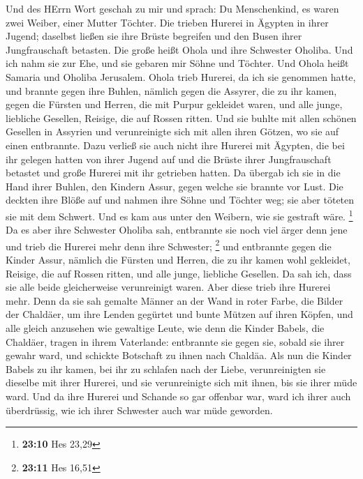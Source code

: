  Und des HErrn Wort geschah zu mir und sprach: 
Du Menschenkind, es waren zwei Weiber, einer Mutter Töchter.
 Die trieben Hurerei in Ägypten in ihrer Jugend; daselbst
ließen sie ihre Brüste begreifen und den Busen ihrer Jungfrauschaft
betasten.  Die große heißt Ohola und ihre Schwester Oholiba.
Und ich nahm sie zur Ehe, und sie gebaren mir Söhne und Töchter. Und
Ohola heißt Samaria und Oholiba Jerusalem.  Ohola trieb
Hurerei, da ich sie genommen hatte, und brannte gegen ihre Buhlen,
nämlich gegen die Assyrer, die zu ihr kamen,  gegen die
Fürsten und Herren, die mit Purpur gekleidet waren, und alle junge,
liebliche Gesellen, Reisige, die auf Rossen ritten.  Und sie
buhlte mit allen schönen Gesellen in Assyrien und verunreinigte sich mit
allen ihren Götzen, wo sie auf einen entbrannte.  Dazu
verließ sie auch nicht ihre Hurerei mit Ägypten, die bei ihr gelegen
hatten von ihrer Jugend auf und die Brüste ihrer Jungfrauschaft betastet
und große Hurerei mit ihr getrieben hatten.  Da übergab ich
sie in die Hand ihrer Buhlen, den Kindern Assur, gegen welche sie
brannte vor Lust.  Die deckten ihre Blöße auf und nahmen
ihre Söhne und Töchter weg; sie aber töteten sie mit dem Schwert. Und es
kam aus unter den Weibern, wie sie gestraft wäre. \footnote{\textbf{23:10}
  Hes 23,29}  Da es aber ihre Schwester Oholiba sah,
entbrannte sie noch viel ärger denn jene und trieb die Hurerei mehr denn
ihre Schwester; \footnote{\textbf{23:11} Hes 16,51}  und
entbrannte gegen die Kinder Assur, nämlich die Fürsten und Herren, die
zu ihr kamen wohl gekleidet, Reisige, die auf Rossen ritten, und alle
junge, liebliche Gesellen.  Da sah ich, dass sie alle beide
gleicherweise verunreinigt waren.  Aber diese trieb ihre
Hurerei mehr. Denn da sie sah gemalte Männer an der Wand in roter Farbe,
die Bilder der Chaldäer,  um ihre Lenden gegürtet und bunte
Mützen auf ihren Köpfen, und alle gleich anzusehen wie gewaltige Leute,
wie denn die Kinder Babels, die Chaldäer, tragen in ihrem Vaterlande:
 entbrannte sie gegen sie, sobald sie ihrer gewahr ward,
und schickte Botschaft zu ihnen nach Chaldäa.  Als nun die
Kinder Babels zu ihr kamen, bei ihr zu schlafen nach der Liebe,
verunreinigten sie dieselbe mit ihrer Hurerei, und sie verunreinigte
sich mit ihnen, bis sie ihrer müde ward.  Und da ihre
Hurerei und Schande so gar offenbar war, ward ich ihrer auch
überdrüssig, wie ich ihrer Schwester auch war müde geworden.
